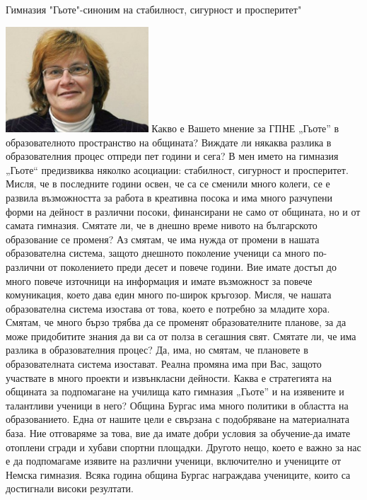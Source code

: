 \begin{multicols}{3}Гимназия "Гьоте"-синоним на стабилност, сигурност и просперитет"

\noindent \includegraphics[width=2.1in]{./Ananieva/5.jpg}
Какво е Вашето мнение за ГПНЕ „Гьоте” в образователното пространство на 
общината? Виждате ли някаква разлика в образователния процес отпреди пет години 
и сега?
В мен името на гимназия „Гьоте“ предизвиква няколко асоциации: стабилност, 
сигурност и просперитет. Мисля, че в последните години освен, че са се сменили 
много колеги, се е развила възможността за работа в креативна посока и има много 
разчупени форми на дейност в различни посоки, финансирани не само от общината, 
но и от самата гимназия.
Смятате ли, че в днешно време нивото на българското образование се променя?
Аз смятам, че има нужда от  промени в нашата образователна система, защото 
днешното поколение ученици са много по-различни от поколението преди десет и 
повече години. Вие имате достъп до много повече източници на информация и имате 
възможност за повече комуникация, което дава един много по-широк кръгозор. 
Мисля, че нашата образователна система изостава от това, което е потребно за 
младите хора. Смятам, че много бързо трябва да се променят образователните 
планове, за да може придобитите знания да ви са от полза в сегашния свят.
Смятате ли, че има разлика в образователния процес?
Да, има, но смятам, че плановете в образователната система изостават. Реална 
промяна има при Вас, защото участвате в много проекти и извънкласни дейности.
Каква е стратегията на общината за подпомагане на училища като гимназия „Гьоте” 
и на изявените и талантливи ученици в него?
Община Бургас има много политики в областта на образованието. Една от нашите 
цели е свързана с подобряване на материалната база. Ние отговаряме за това, вие 
да имате добри условия за обучение-да имате отоплени сгради и хубави спортни 
площадки. Другото нещо, което е важно за нас е да подпомагаме изявите на 
различни ученици, включително и учениците от Немска гимназия. Всяка година 
община Бургас награждава учениците, които са достигнали високи резултати. 

\end{multicols}
